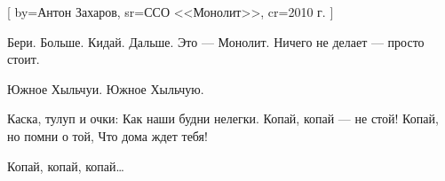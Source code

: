 [
  by={Антон Захаров},
  sr={ССО <<Монолит>>},
  cr={2010 г.}
  ]


\ifdefined\EXPLAINED
	
\else 

\fi


\beginverse
Бери. Больше.
Кидай. Дальше.
Это --- Монолит.
Ничего не делает --- просто стоит.
\endverse


\beginchorus
Южное Хыльчуи. Южное Хыльчую. 
\endchorus


\beginverse
Каска, тулуп и очки:
Как наши будни нелегки.
Копай, копай --- не стой!
Копай, но помни о той, 
Что дома ждет тебя!
\endverse


\beginverse
Копай, копай, копай\dots {} 
\endverse


\endsong

